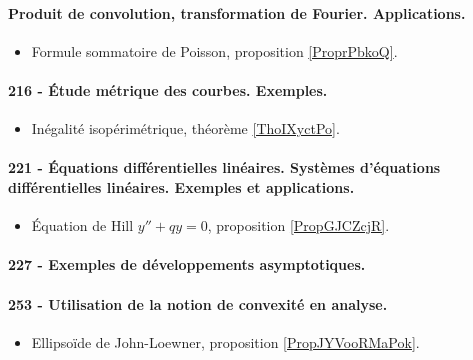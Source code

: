\paragraph{Produit de convolution, transformation de Fourier. Applications.}
\begin{itemize}
    \item Formule sommatoire de Poisson, proposition \ref{ProprPbkoQ}.
\end{itemize}
\paragraph{216 - Étude métrique des courbes. Exemples.}
\begin{itemize}
    \item Inégalité isopérimétrique, théorème \ref{ThoIXyctPo}.
\end{itemize}
\paragraph{221 - Équations différentielles linéaires. Systèmes d’équations différentielles linéaires. Exemples et applications.}
\begin{itemize}
    \item Équation de Hill \( y''+qy=0\), proposition \ref{PropGJCZcjR}.
\end{itemize}
\paragraph{227 - Exemples de développements asymptotiques.}
\paragraph{253 - Utilisation de la notion de convexité en analyse.}
\begin{itemize}
    \item Ellipsoïde de John-Loewner, proposition \ref{PropJYVooRMaPok}.
\end{itemize}
